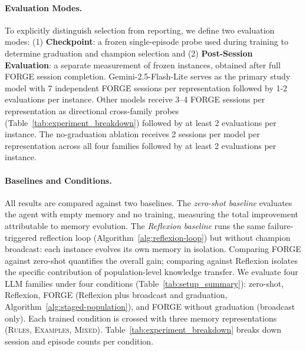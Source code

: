 \documentclass[sigconf]{acmart}
\begin{document}
\paragraph{Evaluation Modes.}
To explicitly distinguish selection from reporting, we define two evaluation modes: (1) \textbf{Checkpoint}: a frozen single-episode probe used during training to determine graduation and champion selection and (2) \textbf{Post-Session Evaluation}: a separate measurement of frozen instances, obtained after full FORGE session completion. Gemini-2.5-Flash-Lite serves as the primary study model with 7 independent FORGE sessions per representation followed by 1-2 evaluations per instance. Other models receive 3--4 FORGE sessions per representation as directional cross-family probes (Table~\ref{tab:experiment_breakdown}) followed by at least 2 evaluations per instance. The no-graduation ablation receives 2 sessions per model per representation across all four families followed by at least 2 evaluations per instance.

\paragraph{Baselines and Conditions.}
All results are compared against two baselines. The \emph{zero-shot baseline} evaluates the agent with empty memory and no training, measuring the total improvement attributable to memory evolution. The \emph{Reflexion baseline} runs the same failure-triggered reflection loop (Algorithm~\ref{alg:reflexion-loop}) but without champion broadcast: each instance evolves its own memory in isolation. Comparing FORGE against zero-shot quantifies the overall gain; comparing against Reflexion isolates the specific contribution of population-level knowledge transfer. We evaluate four LLM families under four conditions (Table~\ref{tab:setup_summary}): zero-shot, Reflexion, FORGE (Reflexion plus broadcast and graduation, Algorithm~\ref{alg:staged-population}), and FORGE without graduation (broadcast only). Each trained condition is crossed with three memory representations (\textsc{Rules}, \textsc{Examples}, \textsc{Mixed}). Table~\ref{tab:experiment_breakdown} breaks down session and episode counts per condition.
\end{document}

